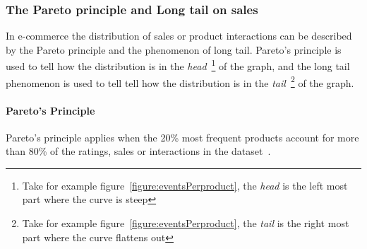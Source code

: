 \subsubsection{The Pareto principle and Long tail on sales}
    In e-commerce the distribution of sales or product interactions can be described by the Pareto principle and the phenomenon of long tail.
    Pareto's principle is used to tell how the distribution is in the \emph{head}~\footnote{Take for example figure~\ref{figure:eventsPerproduct}, the \emph{head} is the left most part where the curve is steep} of the graph, and the long tail phenomenon is used to tell tell how the distribution is in the \emph{tail}~\footnote{Take for example figure~\ref{figure:eventsPerproduct}, the \emph{tail} is the right most part where the curve flattens out} of the graph.

\paragraph{Pareto's Principle}
    Pareto's principle applies when the 20\% most frequent products account for more than 80\% of the ratings, sales or interactions in the dataset~\cite{newman05power}.


